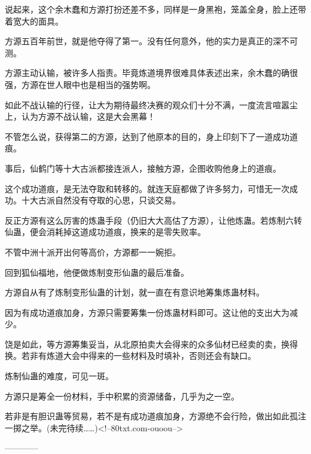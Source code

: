 \begin{this_body}
说起来，这个余木蠢和方源打扮还差不多，同样是一身黑袍，笼盖全身，脸上还带着宽大的面具。

方源五百年前世，就是他夺得了第一。没有任何意外，他的实力是真正的深不可测。

方源主动认输，被许多人指责。毕竟炼道境界很难具体表述出来，余木蠢的确很强，方源在世人眼中也是相当的强势啊。

如此不战认输的行径，让大为期待最终决赛的观众们十分不满，一度流言喧嚣尘上，认为方源不战认输，这是大会黑幕！

不管怎么说，获得第二的方源，达到了他原本的目的，身上印刻下了一道成功道痕。

事后，仙鹤门等十大古派都接连派人，接触方源，企图收购他身上的道痕。

这个成功道痕，是无法夺取和转移的。就连天庭都做了许多努力，可惜无一次成功。十大古派自然没有夺取的心思，只谈交易。

反正方源有这么厉害的炼蛊手段（仍旧大大高估了方源），让他炼蛊。若炼制六转仙蛊，便会消耗掉这道成功道痕，换来的是零失败率。

不管中洲十派开出何等高价，方源都一一婉拒。

回到狐仙福地，他便做炼制变形仙蛊的最后准备。

方源自从有了炼制变形仙蛊的计划，就一直在有意识地筹集炼蛊材料。

因为有成功道痕加身，方源只需要筹集一份炼蛊材料即可。这让他的支出大为减少。

饶是如此，等方源筹集妥当，从北原拍卖大会得来的众多仙材已经卖的卖，换得换。若非有炼道大会中得来的一些材料及时填补，否则还会有缺口。

炼制仙蛊的难度，可见一斑。

方源只是筹全一份材料，手中积累的资源储备，几乎为之一空。

若非是有胆识蛊等贸易，若不是有成功道痕加身，方源绝不会行险，做出如此孤注一掷之举。(未完待续……)<!--80txt.com-ouoou-->

------------

\end{this_body}

